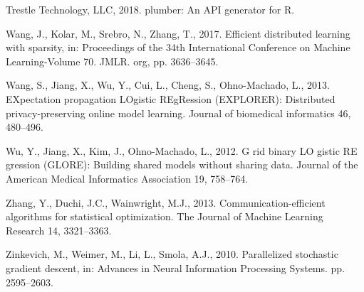 \documentclass[]{elsarticle} %
\newlength{\cslhangindent}
\newenvironment{cslreferences}%
  {\setlength{\parindent}{0pt}%
  \everypar{\setlength{\hangindent}{\cslhangindent}}\ignorespaces}%
  {\par}
\begin{document}
\begin{cslreferences}
\leavevmode\hypertarget{ref-plumber}{}%
Trestle Technology, LLC, 2018. plumber: An API generator for R.

\leavevmode\hypertarget{ref-wang2017efficient}{}%
Wang, J., Kolar, M., Srebro, N., Zhang, T., 2017. Efficient distributed
learning with sparsity, in: Proceedings of the 34th International
Conference on Machine Learning-Volume 70. JMLR. org, pp. 3636--3645.

\leavevmode\hypertarget{ref-explorer}{}%
Wang, S., Jiang, X., Wu, Y., Cui, L., Cheng, S., Ohno-Machado, L., 2013.
EXpectation propagation LOgistic REgRession (EXPLORER): Distributed
privacy-preserving online model learning. Journal of biomedical
informatics 46, 480--496.

\leavevmode\hypertarget{ref-glore}{}%
Wu, Y., Jiang, X., Kim, J., Ohno-Machado, L., 2012. G rid binary LO
gistic RE gression (GLORE): Building shared models without sharing data.
Journal of the American Medical Informatics Association 19, 758--764.

\leavevmode\hypertarget{ref-zhang2013communication}{}%
Zhang, Y., Duchi, J.C., Wainwright, M.J., 2013. Communication-efficient
algorithms for statistical optimization. The Journal of Machine Learning
Research 14, 3321--3363.

\leavevmode\hypertarget{ref-zinkevich2010parallelized}{}%
Zinkevich, M., Weimer, M., Li, L., Smola, A.J., 2010. Parallelized
stochastic gradient descent, in: Advances in Neural Information
Processing Systems. pp. 2595--2603.
\end{cslreferences}
\end{document}
